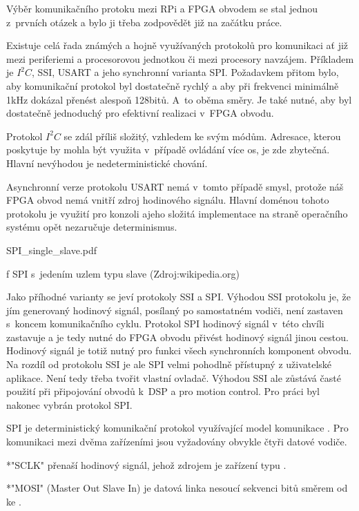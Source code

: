  Výběr komunikačního protoku mezi RPi a FPGA obvodem se stal jednou z~prvních otázek a bylo ji třeba zodpovědět již na začátku práce. 
 
 Existuje celá řada známých a hojně využívaných protokolů pro komunikaci ať již mezi periferiemi a procesorovou jednotkou či mezi procesory navzájem. Příkladem je $I^2C$, SSI, USART a jeho synchronní varianta SPI. Požadavkem přitom bylo, aby komunikační protokol byl dostatečně rychlý a aby při frekvenci minimálně 1kHz dokázal přenést alespoň 128bitů. A~to oběma směry. Je také nutné, aby byl dostatečně jednoduchý pro efektivní realizaci v~FPGA obvodu.
 
 Protokol $I^2C$ se zdál příliš složitý, vzhledem ke svým módům. Adresace, kterou poskytuje by mohla být využita v~případě ovládání více os, je zde zbytečná. Hlavní nevýhodou je nedeterministické chování.
 
  Asynchronní verze protokolu USART nemá v~tomto případě smysl, protože náš FPGA obvod nemá vnitří zdroj hodinového signálu. Hlavní doménou tohoto protokolu je využití pro konzoli ajeho složitá implementace na straně operačního systému opět nezaručuje determinismus.
  
\midinsert {}
\picw=10cm \cinspic SPI_single_slave.pdf
\caption/f SPI s~jedením uzlem typu slave (Zdroj:wikipedia.org)
\endinsert

   Jako příhodné varianty se jeví protokoly SSI a SPI. Výhodou SSI protokolu je, že jím generovaný hodinový signál, posílaný po samostatném vodiči, není zastaven s~koncem komunikačního cyklu. Protokol SPI hodinový signál v~této chvíli zastavuje a je tedy nutné do FPGA obvodu přivést hodinový signál jinou cestou. Hodinový signál je totiž nutný pro funkci všech synchronních komponent obvodu. Na rozdíl od protokolu SSI je ale SPI velmi pohodlně přístupný z uživatelské aplikace. Není tedy třeba tvořit vlastní ovladač. Výhodou SSI ale zůstává časté použití při připojování obvodů k~DSP a pro motion control. Pro práci byl nakonec vybrán protokol SPI. 

SPI je deterministický komunikační protokol využívající model komunikace . Pro komunikaci mezi dvěma zařízeními jsou vyžadovány obvykle čtyři datové vodiče. 

\begitems

*"SCLK" přenaší hodinový signál, jehož zdrojem je zařízení typu . 

*"MOSI" (Master Out Slave In) je datová linka nesoucí sekvenci bitů směrem od  ke . 


